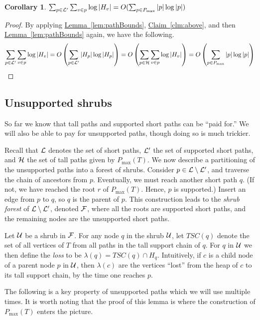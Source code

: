 \documentclass[11pt]{article}
\newtheorem{corollary}[theorem]{Corollary}
\theoremstyle{definition}
\newcommand{\cF}{{\cal F}}
\newcommand{\cH}{{\cal H}}
\newcommand{\cL}{{\cal L}}
\newcommand{\cU}{{\cal U}}
\newcommand{\Clm}[1]{\hyperref[clm:#1]{Claim~\ref*{clm:#1}}} %
\newcommand{\Lem}[1]{\hyperref[lem:#1]{Lemma~\ref*{lem:#1}}} %
\newcommand{\pmax}{P_{\max}}
\begin{document}
\begin{corollary}\label{cor:supported}
  $\sum_{p \in \cL'} \sum_{v \in p} \log |H_v|= O(\sum_{p\in \pmax} |p|\log |p|)$
\end{corollary}
\begin{proof}
 By applying \Lem{pathBounds}, \Clm{above}, and then \Lem{pathBounds} again, we have the following.
 \begin{align*}
  \sum_{p \in \cL'} \sum_{v \in p} \log |H_v| 
  =  O\left(\sum_{p \in \cL'} |H_p| \log |H_p|\right)
  = O\left(\sum_{p \in \cH} \sum_{v \in p} \log |H_v|\right)
  = O\left(\sum_{p\in \pmax} |p|\log |p|\right)
 \end{align*}
\end{proof}





\newcommand{\loss}{\lambda}

\subsection{Unsupported shrubs}

So far we know that tall paths and supported short paths can be ``paid for.''  We will also be able to pay for 
unsupported paths, though doing so is much trickier.

Recall that $\cL$ denotes the set of short paths, $\cL'$ the set of supported short paths, and $\cH$ the set of tall paths
given by $\pmax(T)$. We now describe a partitioning of the unsupported paths into a forest of shrubs. Consider $p \in \cL \setminus \cL'$,
and traverse the chain of ancestors from $p$. Eventually, we must reach another short path $q$.
(If not, we have reached the root $r$ of $\pmax(T)$. Hence, $p$ is supported.)
Insert an edge from $p$ to $q$, so $q$ is the parent of $p$. This construction leads
to the \emph{shrub forest} of $\cL \setminus \cL'$, denoted $\cF$, where all the roots are supported short paths, 
and the remaining nodes are the unsupported short paths. 

Let $\cU$ be a shrub in $\cF$.  For any node $q$ in the shrub $\cU$, let $TSC(q)$ denote the set of all vertices of $T$ from all paths in the tall support chain of $q$.
For $q$ in $\cU$ we then define the \emph{loss} to be $\loss(q) = TSC(q)\cap H_q$. 
Intuitively, if $c$ is a child node of a parent node $p$ in $\cU$, then $\loss(c)$ are the vertices ``lost'' from the heap of $c$ to its tall support chain, by the time one reaches $p$.

The following is a key property of unsupported paths which 
we will use multiple times. It is worth noting that the proof of this lemma is where the construction of $\pmax(T)$ enters the picture.
\end{document}
